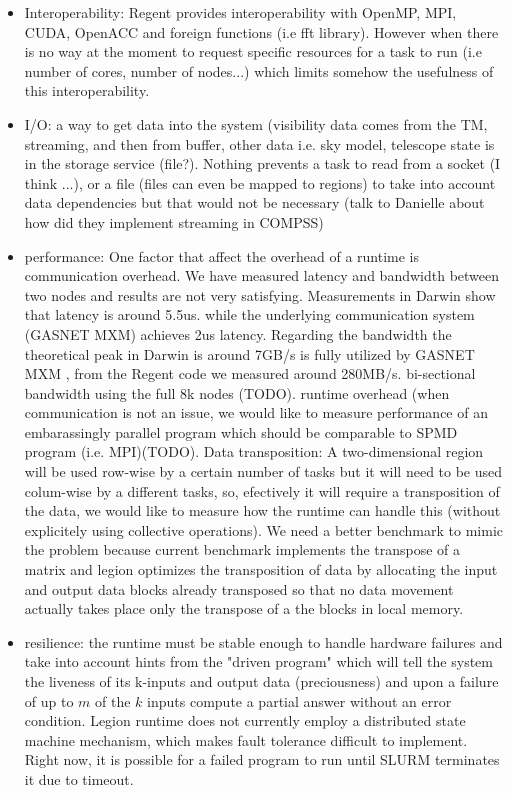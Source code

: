 \begin{itemize}
\item Interoperability: Regent provides interoperability with OpenMP,  MPI, CUDA, OpenACC and foreign functions  (i.e fft library). However when there is no way at the moment to request specific resources for a task to run (i.e number of cores, number of nodes...) which limits somehow the usefulness of this interoperability.
\item I/O: a way to get data into the system (visibility data comes from the TM, streaming, and then from buffer, other data i.e. sky model, telescope state is in the storage service (file?). Nothing prevents a task to read from a socket (I think ...), or a file (files can even be mapped to regions) to take into account data dependencies but that would not be necessary (talk to Danielle about how did they implement streaming in COMPSS)
\item performance: One factor that affect the overhead of a runtime is communication overhead. We have measured latency and bandwidth between two nodes and results are not very satisfying. Measurements in Darwin show that latency is around 5.5us. while the underlying communication system (GASNET MXM) achieves 2us latency. Regarding the bandwidth the theoretical peak in Darwin is around 7GB/s is fully utilized by GASNET MXM , from the Regent code we measured around 280MB/s. bi-sectional bandwidth using the full 8k nodes (TODO). runtime overhead (when communication is not an issue, we would like to measure performance of an embarassingly parallel program which should be comparable to SPMD program (i.e. MPI)(TODO). Data transposition: A two-dimensional region will be used row-wise by a certain number of tasks but it will need to be used colum-wise by a different tasks, so, efectively it will require a transposition of the data, we would like to measure how the runtime can handle this (without explicitely using collective operations). We need a better benchmark to mimic the problem because current benchmark implements the transpose of a matrix and legion optimizes the transposition of  data by allocating the input and output data blocks already transposed so that no data movement actually takes place only the transpose of a the blocks in local memory.
\item resilience: the runtime must be stable enough to handle hardware failures and take into account hints from the "driven program" which will tell the system the liveness of its k-inputs and output data (preciousness) and upon a failure of up to $m$ of the $k$ inputs compute a partial answer without an error condition. Legion runtime does not currently employ a distributed state machine mechanism, which makes fault tolerance difficult to implement. Right now, it is possible for a failed program to run until SLURM terminates it due to timeout.  

\end{itemize}
